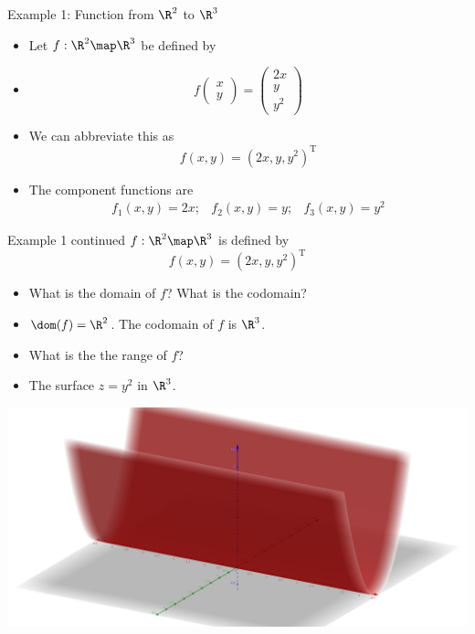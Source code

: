 \documentclass{beamer}
\begin{document}

\begin{frame}{Example 1: Function from $\R^2$ to $\R^3$}
\begin{itemize}
\item Let $f:\R^2\map\R^3$ be defined by
\item
$$
f
\begin{pmatrix}
x \\ y
\end{pmatrix}
=
\begin{pmatrix}
2x \\ y \\ y^2
\end{pmatrix}
$$
\item We can abbreviate this as
$$f(x,y) = (2x, y, y^2)^{\text{T}}$$
\item The component functions are
$$
\begin{matrix}
f_1(x,y) = 2x; & f_2(x,y) = y; & f_3(x,y) = y^2
\end{matrix}
$$
\end{itemize}
\end{frame}


\begin{frame}{Example 1 continued}
$f:\R^2\map\R^3$ is defined by
$$f(x,y) = (2x, y, y^2)^{\text{T}}$$
\begin{itemize}
\item What is the domain of $f$? What is the codomain?
\item $\dom(f) =\R^2$. The codomain of $f$ is $\R^3$.
\item What is the the range of $f$?
\item The surface $z=y^2$ in $\R^3$.
\end{itemize}
\pause
\includegraphics[scale=0.1]{z-equals-y-squared}
\end{frame}
\end{document}

